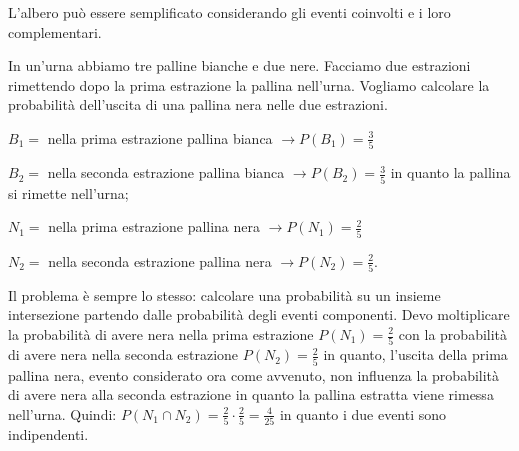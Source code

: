 L'albero può essere semplificato considerando gli eventi coinvolti e i loro 
complementari.

\begin{esempio}
In un'urna abbiamo tre palline bianche e due nere. Facciamo due estrazioni 
rimettendo dopo la prima estrazione la pallina nell'urna. Vogliamo calcolare 
la 
probabilità dell'uscita di una pallina nera nelle due estrazioni.
\begin{itemize*}
\item \( B_{1}= \) nella prima estrazione pallina bianca \(\to P(B_1)=\frac 3 5\)
\item \( B_{2}= \) nella seconda estrazione pallina bianca \(\to P(B_2)=\frac 3 
5\) 
in quanto la pallina si rimette nell'urna;
\item \( N_{1}= \) nella prima estrazione pallina nera \(\to P(N_1)=\frac 2 5\)
\item \( N_{2}= \) nella seconda estrazione pallina nera \(\to P(N_2)=\frac 2 5\).
\end{itemize*}
Il problema è sempre lo stesso: calcolare una probabilità su un insieme 
intersezione partendo dalle probabilità degli eventi componenti. Devo 
moltiplicare la probabilità di avere nera nella prima estrazione 
\(P(N_1)=\frac 
2 
5\) con la probabilità di avere nera nella seconda estrazione \(P(N_2)=\frac 2 
5\) 
in quanto, l'uscita della prima pallina nera, evento considerato ora come 
avvenuto, non influenza la probabilità di avere nera alla seconda estrazione 
in 
quanto la pallina estratta viene rimessa nell'urna. Quindi: \(P(N_1\cap 
N_2)=\frac 2 5\cdot \frac 2 5=\frac 4{25}\) in quanto i due eventi sono 
indipendenti.

\begin{center}
\end{center}
\end{esempio}
